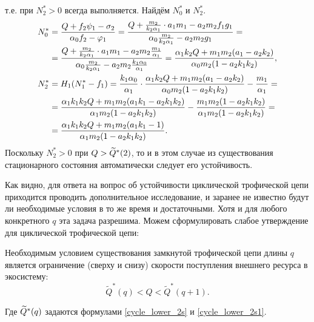 \begin{enumerate}
т.е. при \(N^*_2 > 0\) всегда выполняется. Найдём \(N^*_0\) и \( N^*_2\). 
\begin{equation*}
    \begin{split}
        N^*_0 &= \frac{Q + f_2 \psi_1 - \sigma_2}{\alpha_0 f_2 - \varphi_1} = \frac{Q + \frac{m_2}{k_2 \alpha_1} \cdot a_1 m_1 - a_2 m_2 f_1 g_1}{\alpha_0 \frac{m_2}{k_2 \alpha_1} - a_2 m_2 g_1} =\\
        & = \frac{Q + \frac{m_2}{k_2 \alpha_1} \cdot a_1 m_1 - a_2 m_2 \frac{m_1}{\alpha_1}}{\alpha_0 \frac{m_2}{k_2 \alpha_1} - a_2 m_2 \frac{k_1 \alpha_0}{\alpha_1}} = 
        \frac{\alpha_1 k_2 Q +  m_1 m_2 ( a_1- a_2 k_2 )}{\alpha_0 m_2 ( 1- a_2 k_1 k_2 ) }, \\
        N^*_2 &= H_1 (N^*_1 - f_1) = \frac{k_1 \alpha_0}{\alpha_1} \cdot \frac{\alpha_1 k_2 Q +  m_1 m_2 ( a_1- a_2 k_2 )}{\alpha_0 m_2 ( 1 - a_2 k_1 k_2 ) } - \frac{m_1}{\alpha_1} =\\
        & = \frac{\alpha_1 k_1 k_2 Q + m_1 m_2 ( a_1 k_1 - a_2 k_1 k_2 )}{\alpha_1 m_2 ( 1- a_2 k_1 k_2 ) } - \frac{m_1 m_2 ( 1- a_2 k_1 k_2 )}{\alpha_1 m_2 ( 1- a_2 k_1 k_2 )} = \\
        & = \frac{\alpha_1 k_1 k_2 Q + m_1 m_2 ( a_1 k_1 - 1 )}{\alpha_1 m_2 ( 1- a_2 k_1 k_2 ) }.
    \end{split}
\end{equation*}
Поскольку \( N^*_2 > 0 \) при \( Q > \widetilde{Q}^*(2)\), то и в этом случае из существования стационарного состояния автоматически следует его устойчивость.
\end{enumerate}

Как видно, для ответа на вопрос об устойчивости циклической трофической цепи приходится проводить дополнительное исследование, и заранее не известно будут ли необходимые условия в то же время и достаточными. Хотя и для любого конкретного \(q\) эта задача разрешима. Можем сформулировать слабое утверждение для циклической трофической цепи:
\begin{corollary}
    Необходимым условием существования замкнутой трофической цепи длины \(q\) является ограничение (сверху и снизу) скорости поступления внешнего ресурса в экосистему:
    \begin{equation}
        \widetilde{Q}^*(q) < Q < \widetilde{Q}^*(q+1).
    \end{equation}
\end{corollary}
Где \(\widetilde{Q}^*(q)\) задаются формулами \eqref{cycle_lower_2s} и \eqref{cycle_lower_2s1}.

